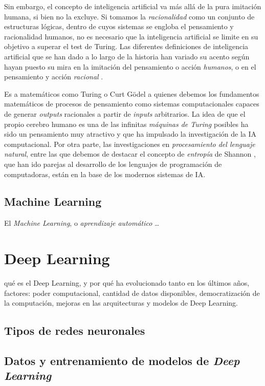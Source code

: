 Sin embargo, el concepto de inteligencia artificial va más allá de la pura imitación humana, si bien no la excluye. Si tomamos la \emph{racionalidad} como un conjunto de estructuras lógicas, dentro de cuyos sistemas se engloba el pensamiento y racionalidad humanos, no es necesario que la inteligencia artificial se limite en su objetivo a superar el test de Turing. Las diferentes definiciones de inteligencia artificial que se han dado a lo largo de la historia han variado su acento según hayan puesto su mira en la imitación del pensamiento o acción \emph{humanos}, o en el pensamiento y acción \emph{racional} \cite{RussellStuartJ2021AI:A}.

Es a matemáticos como Turing o Curt Gödel a quienes debemos los fundamentos matemáticos de procesos de pensamiento como sistemas computacionales capaces de generar \textit{outputs} racionales a partir de \textit{inputs} arbitrarios. La idea de que el propio cerebro humano es una de las infinitas \emph{máquinas de Turing} posibles \cite{penroseNuevaMenteEmperador2015} ha sido un pensamiento muy atractivo y que ha impulsado la investigación de la IA computacional. Por otra parte, las investigaciones en \textit{procesamiento del lenguaje natural}, entre las que debemos de destacar el concepto de \emph{entropía} de Shannon \cite{shannon1951prediction}, que han ido parejas al desarrollo de los lenguajes de programación de computadoras, están en la base de los modernos sistemas de IA.

\subsection{Machine Learning}

El \textit{Machine Learning}, o \textit{aprendizaje automático} \dots


\section{Deep Learning}

qué es el Deep Learning, y por qué ha evolucionado tanto en los últimos años, factores: poder computacional, cantidad de datos disponibles, democratización de la computación, mejoras en las arquitecturas y modelos de Deep Learning.


\subsection{Tipos de redes neuronales}
\subsection{Datos y entrenamiento de modelos de \textit{Deep Learning}}
